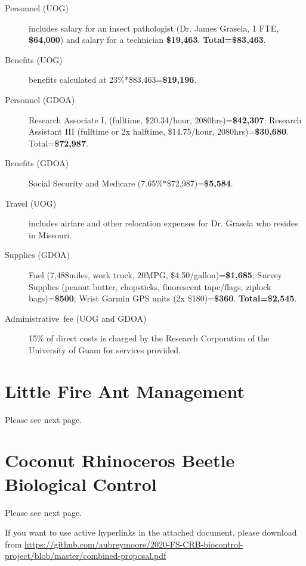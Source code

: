 \documentclass[12pt,letterpaper,english,bibliography=totocnumbered, abstract=on]{scrartcl}
\begin{document}
\begin{description}
	
	\item [{Personnel (UOG)}] includes salary for an insect pathologist (Dr. James Grasela, 1 FTE, \textbf{\$64,000}) and salary for a technician \textbf{\$19,463}.
	\textbf{Total=\$83,463}.
	
	\item [{Benefits (UOG)}] benefits calculated at 23\%*\$83,463=\textbf{\$19,196}.

	\item [{Personnel (GDOA)}] Research Associate I, (fulltime, \$20.34/hour, 2080hrs)=\textbf{\$42,307}; 
	Research Assistant III (fulltime or 2x halftime, \$14.75/hour, 2080hrs)=\textbf{\$30,680}. Total=\textbf{\$72,987}.
	
	\item [{Benefits (GDOA)}] Social Security and Medicare (7.65\%*\$72,987)=\textbf{\$5,584}.
	
	\item [{Travel (UOG)}] includes airfare and other relocation expenses for Dr. Grasela who resides in Missouri.
	
	\item [{Supplies (GDOA)}]  
	Fuel (7,488miles, work truck, 20MPG, \$4.50/gallon)=\textbf{\$1,685}; 
	Survey Supplies (peanut butter, chopsticks, fluorescent tape/flags, ziplock bags)=\textbf{\$500}; 
	Wrist Garmin GPS units (2x \$180)=\textbf{\$360}. \textbf{Total=\$2,545}.	
	
	\item [{Administrative~fee (UOG and GDOA)}] 15\% of direct costs
	is charged by the Research Corporation of the University of Guam for
	services provided. 
	
\end{description}


\pagebreak
\section{Little Fire Ant Management}
Please see next page.

%

\section{Coconut Rhinoceros Beetle Biological Control}
Please see next page.

If you want to use active hyperlinks in the attached document, please download from 
\tiny{\url{https://github.com/aubreymoore/2020-FS-CRB-biocontrol-project/blob/master/combined-proposal.pdf}}
\end{document}
